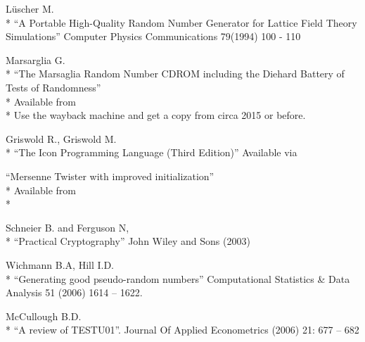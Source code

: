 \documentclass[letterpaper,12pt]{article}
\begin{document}
\begin{thebibliography}{99}
\begin{samepage}
  L\"uscher M.\\*
  ``A  Portable  High-Quality  Random  Number  Generator  for
  Lattice Field Theory Simulations''
  Computer Physics Communications 79(1994) 100 - 110
\end{samepage}

  Marsarglia G.\\*
  ``The Marsaglia Random Number CDROM including the Diehard Battery of Tests
  of Randomness''\\*
  Available from \\*
  Use the wayback machine\cite{WayBack} and get a copy from circa 2015 or before.
  
\begin{samepage}
  Griswold R., Griswold M.\\*
  ``The Icon Programming Language (Third Edition)''
  Available via 
\end{samepage}

\begin{samepage}
  ``Mersenne Twister with improved initialization''\\*
  Available from\\*
\end{samepage}

\begin{samepage}
  Schneier B. and Ferguson N,\\*
  ``Practical Cryptography''
  John Wiley and Sons (2003)
\end{samepage}

  Wichmann B.A, Hill I.D.\\*
  ``Generating good pseudo-random numbers''
  Computational Statistics \& Data Analysis 51 (2006) 1614 – 1622.

  McCullough B.D.\\*
  ``A review of TESTU01''.
  Journal Of Applied Econometrics (2006)  21: 677 – 682


\end{thebibliography}
\end{document}
